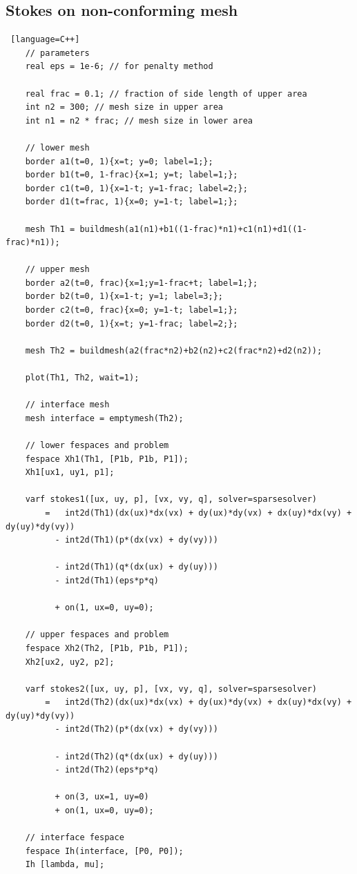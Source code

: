 \documentclass{article}
\begin{document}
\subsection*{Stokes on non-conforming mesh}
\begin{lstlisting} [language=C++]
	// parameters
	real eps = 1e-6; // for penalty method 

	real frac = 0.1; // fraction of side length of upper area
	int n2 = 300; // mesh size in upper area
	int n1 = n2 * frac; // mesh size in lower area

	// lower mesh
	border a1(t=0, 1){x=t; y=0; label=1;};
	border b1(t=0, 1-frac){x=1; y=t; label=1;};
	border c1(t=0, 1){x=1-t; y=1-frac; label=2;};
	border d1(t=frac, 1){x=0; y=1-t; label=1;};

	mesh Th1 = buildmesh(a1(n1)+b1((1-frac)*n1)+c1(n1)+d1((1-frac)*n1));

	// upper mesh
	border a2(t=0, frac){x=1;y=1-frac+t; label=1;};
	border b2(t=0, 1){x=1-t; y=1; label=3;};
	border c2(t=0, frac){x=0; y=1-t; label=1;};
	border d2(t=0, 1){x=t; y=1-frac; label=2;};

	mesh Th2 = buildmesh(a2(frac*n2)+b2(n2)+c2(frac*n2)+d2(n2));

	plot(Th1, Th2, wait=1);

	// interface mesh
	mesh interface = emptymesh(Th2);

	// lower fespaces and problem
	fespace Xh1(Th1, [P1b, P1b, P1]);
	Xh1[ux1, uy1, p1];

	varf stokes1([ux, uy, p], [vx, vy, q], solver=sparsesolver)
		=   int2d(Th1)(dx(ux)*dx(vx) + dy(ux)*dy(vx) + dx(uy)*dx(vy) + dy(uy)*dy(vy))
	  	  - int2d(Th1)(p*(dx(vx) + dy(vy)))

	  	  - int2d(Th1)(q*(dx(ux) + dy(uy)))
	  	  - int2d(Th1)(eps*p*q)

	  	  + on(1, ux=0, uy=0);

	// upper fespaces and problem
	fespace Xh2(Th2, [P1b, P1b, P1]);
	Xh2[ux2, uy2, p2];

	varf stokes2([ux, uy, p], [vx, vy, q], solver=sparsesolver)
		=   int2d(Th2)(dx(ux)*dx(vx) + dy(ux)*dy(vx) + dx(uy)*dx(vy) + dy(uy)*dy(vy))
	  	  - int2d(Th2)(p*(dx(vx) + dy(vy)))

	  	  - int2d(Th2)(q*(dx(ux) + dy(uy)))
	  	  - int2d(Th2)(eps*p*q)

	  	  + on(3, ux=1, uy=0)
	  	  + on(1, ux=0, uy=0);

	// interface fespace
	fespace Ih(interface, [P0, P0]);
	Ih [lambda, mu];


\end{lstlisting}
\end{document}
